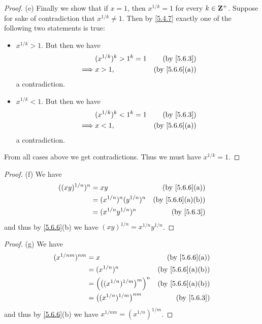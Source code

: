 \begin{proof}{(e)}
  Finally we show that if \(x = 1\), then \(x^{1 / k} = 1\) for every \(k \in \mathbf{Z}^+\).
  Suppose for sake of contradiction that \(x^{1 / k} \neq 1\).
  Then by \cref{5.4.7} exactly one of the following two statements is true:
  \begin{itemize}
    \item \(x^{1 / k} > 1\).
          But then we have
          \begin{align*}
                     & (x^{1 / k})^k > 1^k = 1 & \text{(by \cref{5.6.3})}    \\
            \implies & x > 1,                  & \text{(by \cref{5.6.6}(a))}
          \end{align*}
          a contradiction.
    \item \(x^{1 / k} < 1\).
          But then we have
          \begin{align*}
                     & (x^{1 / k})^k < 1^k = 1 & \text{(by \cref{5.6.3})}    \\
            \implies & x < 1,                  & \text{(by \cref{5.6.6}(a))}
          \end{align*}
          a contradiction.
  \end{itemize}
  From all cases above we get contradictions.
  Thus we must have \(x^{1 / k} = 1\).
\end{proof}

\begin{proof}{(f)}
  We have
  \begin{align*}
    ((xy)^{1 / n})^n & = xy                          & \text{(by \cref{5.6.6}(a))}    \\
                     & = (x^{1 / n})^n (y^{1 / n})^n & \text{(by \cref{5.6.6}(a)(b))} \\
                     & = (x^{1 / n} y^{1 / n})^n     & \text{(by \cref{5.6.3})}
  \end{align*}
  and thus by \cref{5.6.6}(b) we have \((xy)^{1 / n} = x^{1 / n} y^{1 / n}\).
\end{proof}

\begin{proof}{(g)}
  We have
  \begin{align*}
    (x^{1 / nm})^{nm} & = x                                           & \text{(by \cref{5.6.6}(a))}    \\
                      & = (x^{1 / n})^n                               & \text{(by \cref{5.6.6}(a)(b))} \\
                      & = \Big(\big((x^{1 / n})^{1 / m}\big)^m\Big)^n & \text{(by \cref{5.6.6}(a)(b))} \\
                      & = \big((x^{1 / n})^{1 / m}\big)^{nm}          & \text{(by \cref{5.6.3})}
  \end{align*}
  and thus by \cref{5.6.6}(b) we have \(x^{1 / nm} = (x^{1 / n})^{1 / m}\).
\end{proof}


